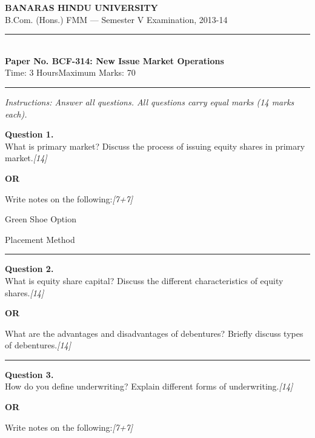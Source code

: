 \documentclass[11pt,a4paper]{article}
\newcommand{\pts}[1]{\hfill   \textit{[#1]}}
\begin{document}
\begin{center}
  {\large\bfseries BANARAS HINDU UNIVERSITY}\\[2pt]
  {\normalsize B.Com. (Hons.) FMM --- Semester V Examination, 2013-14}\\[6pt]
  \rule{0.8\linewidth}{0.5pt}\\[6pt]
  {\large\bfseries Paper No. BCF-314: New Issue Market Operations}\\[4pt]
  {\normalsize Time: 3 Hours\hfill Maximum Marks: 70}
\end{center}

\rule{\linewidth}{0.4pt}

\smallskip



\noindent   \textit{Instructions: Answer all questions. All questions carry equal marks (14 marks each).}

\bigskip




\noindent   \textbf{Question 1.} \\
What is primary market? Discuss the process of issuing equity shares in primary market.\pts{14}

\centerline{   \textbf{OR}}

Write notes on the following:\pts{7+7}

\begin{parts}
  \item Green Shoe Option
  \item Placement Method
\end{parts}

\medskip\rule{\linewidth}{0.2pt}




\noindent   \textbf{Question 2.} \\
What is equity share capital? Discuss the different characteristics of equity shares.\pts{14}

\centerline{   \textbf{OR}}

What are the advantages and disadvantages of debentures? Briefly discuss types of debentures.\pts{14}

\medskip\rule{\linewidth}{0.2pt}




\noindent   \textbf{Question 3.} \\
How do you define underwriting? Explain different forms of underwriting.\pts{14}

\centerline{   \textbf{OR}}

Write notes on the following:\pts{7+7}
\end{document}
